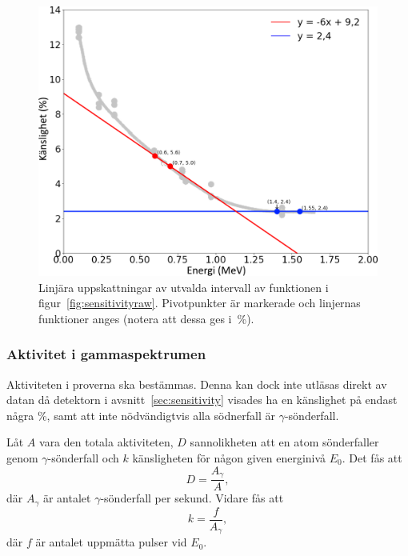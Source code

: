 \begin{figure}[!hp]
    \centering
    \includegraphics[width=\textwidth, keepaspectratio]{../images/sensitivity.png}
    \caption{
        Linjära uppskattningar av utvalda intervall av funktionen i
        figur~\ref{fig:sensitivityraw}. Pivotpunkter är markerade och linjernas
        funktioner anges (notera att dessa ges i~\unit{\percent}).
    }
    \label{fig:sensitivity}
\end{figure}

\subsubsection{Aktivitet i gammaspektrumen} \label{sec:activity}

Aktiviteten i proverna ska bestämmas. Denna kan dock inte utläsas direkt av
datan då detektorn i avsnitt~\ref{sec:sensitivity} visades ha en känslighet
på endast några \unit{\percent}, samt att inte nödvändigtvis alla södnerfall är
$\gamma$-sönderfall.

Låt $A$ vara den totala aktiviteten, $D$ sannolikheten att en atom
sönderfaller genom $\gamma$-sönderfall och $k$ känsligheten för någon given
energinivå $E_0$. Det fås att
%
\begin{equation}
    D = \frac{A_\gamma}{A} \label{eq:sharegamma},
\end{equation}
%
där $A_\gamma$ är antalet $\gamma$-sönderfall per sekund. Vidare fås att
%
\begin{equation}
    k = \frac{f}{A_\gamma} \label{eq:sensitivity},
\end{equation}
%
där $f$ är antalet uppmätta pulser vid $E_0$.

